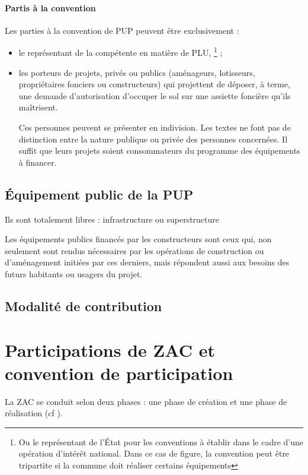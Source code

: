 		\paragraph{Partis à la convention} Les parties à la convention de PUP peuvent être
		exclusivement :
		\begin{itemize}
			\item le représentant de la \commune compétente en matière de PLU,
				\footnote{Ou le représentant de l’État pour les conventions à établir dans le cadre d’une opération
				d’intérêt national. Dans ce  cas de figure, la convention peut être tripartite si la commune doit réaliser certains équipements} ;
				
			\item les porteurs de projets, privés ou publics
				(aménageurs, lotisseurs, propriétaires fonciers
				ou constructeurs) qui projettent de déposer, à
				terme, une demande d’autorisation d’occuper
				le sol sur une assiette foncière qu’ils maîtrisent.
			
			Ces personnes peuvent se présenter en indivision. Les textes ne font pas de distinction entre
			la nature publique ou privée des personnes
			concernées. Il suffit que leurs projets soient
			consommateurs du programme des équipements à financer. 
		\end{itemize}
	
	\subsection{Équipement public de la PUP}
	
		Ils sont totalement libres : infrastructure ou superstructure
		
		Les équipements publics financés par les constructeurs sont ceux qui, non seulement sont rendus nécessaires par les opérations de construction ou d’aménagement initiées par ces derniers, mais répondent aussi aux besoins des futurs habitants ou usagers du projet.
	
	\subsection{Modalité de contribution}
	
\section{Participations de ZAC et convention de participation}
	
	La ZAC se conduit selon deux phases : une phase de création et une phase de réalisation (cf ).
	

